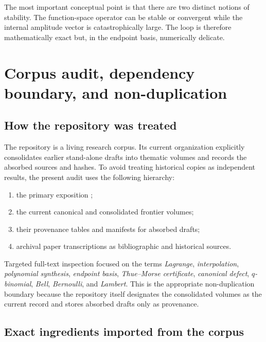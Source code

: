 \documentclass[11pt,oneside]{article}
\theoremstyle{definition}
\theoremstyle{remark}
\newcommand{\1}{\mathbf{1}}
\begin{document}
The most important conceptual point is that there are two distinct notions of
stability.  The function-space operator can be stable or convergent while the
internal amplitude vector is catastrophically large.  The loop is therefore
mathematically exact but, in the endpoint basis, numerically delicate.

\section{Corpus audit, dependency boundary, and non-duplication}
\label{sec:corpus}

\subsection{How the repository was treated}

The repository is a living research corpus.  Its current organization
explicitly consolidates earlier stand-alone drafts into thematic volumes and
records the absorbed sources and hashes.  To avoid treating historical copies
as independent results, the present audit uses the following hierarchy:

\begin{enumerate}
\item the primary exposition
;
\item the current canonical and consolidated frontier volumes;
\item their provenance tables and manifests for absorbed drafts;
\item archival paper transcriptions as bibliographic and historical sources.
\end{enumerate}

Targeted full-text inspection focused on the terms \emph{Lagrange},
\emph{interpolation}, \emph{polynomial synthesis}, \emph{endpoint basis},
\emph{Thue--Morse certificate}, \emph{canonical defect}, \emph{$q$-binomial},
\emph{Bell}, \emph{Bernoulli}, and \emph{Lambert}.  This is the appropriate
non-duplication boundary because the repository itself designates the
consolidated volumes as the current record and stores absorbed drafts only as
provenance.

\subsection{Exact ingredients imported from the corpus}
\end{document}

